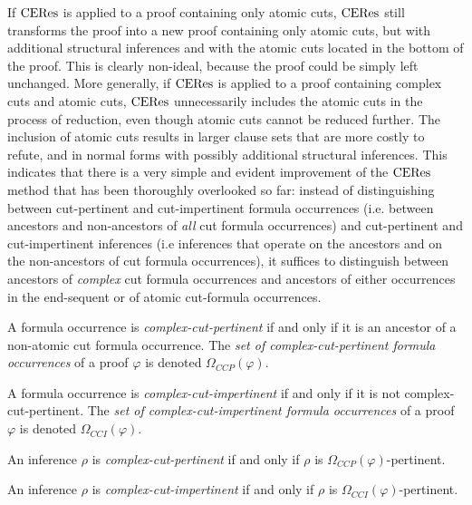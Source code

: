 \documentclass{llncs}
\begin{document}
If $\mathrm{CERes}$ is applied to a proof containing only atomic cuts, $\mathrm{CERes}$ still transforms the proof into a new proof containing only atomic cuts, but with additional structural inferences and with the atomic cuts located in the bottom of the proof. This is clearly non-ideal, because the proof could be simply left unchanged. More generally, if $\mathrm{CERes}$ is applied to a proof containing complex cuts and atomic cuts, $\mathrm{CERes}$ unnecessarily includes the atomic cuts in the process of reduction, even though atomic cuts cannot be reduced further. The inclusion of atomic cuts results in larger clause sets that are more costly to refute, and in normal forms with possibly additional structural inferences. This indicates that there is a very simple and evident improvement of the $\mathrm{CERes}$ method that has been thoroughly overlooked so far: instead of distinguishing between cut-pertinent and cut-impertinent formula occurrences (i.e. between ancestors and non-ancestors of \emph{all} cut formula occurrences) and cut-pertinent and cut-impertinent inferences (i.e inferences that operate on the ancestors and on the non-ancestors of cut formula occurrences), it suffices to distinguish between ancestors of \emph{complex} cut formula occurrences and ancestors of either occurrences in the end-sequent or of atomic cut-formula occurrences.


\newcommand{\occCutPertComplex}[1]{\Omega_{CCP}(#1)}   %
\newcommand{\occCutImpertComplex}[1]{\Omega_{CCI}(#1)}   %
\begin{definition}
\label{definition:ComplexCutPertinenceOccurrences}
A formula occurrence is \emph{complex-cut-pertinent} if and only if it is an ancestor of a non-atomic cut formula occurrence. The \emph{set of complex-cut-pertinent formula occurrences} of a proof $\varphi$ is denoted $\occCutPertComplex{\varphi}$.

A formula occurrence is \emph{complex-cut-impertinent} if and only if it is not complex-cut-pertinent. The \emph{set of complex-cut-impertinent formula occurrences} of a proof $\varphi$ is denoted $\occCutImpertComplex{\varphi}$.
\end{definition}

\begin{definition}
\label{definition:CutPertinenceInferences}
An inference $\rho$ is \emph{complex-cut-pertinent} if and only if $\rho$ is $\occCutPertComplex{\varphi}$-pertinent.

An inference $\rho$ is \emph{complex-cut-impertinent} if and only if $\rho$ is $\occCutImpertComplex{\varphi}$-pertinent.
\end{definition}
\end{document}
